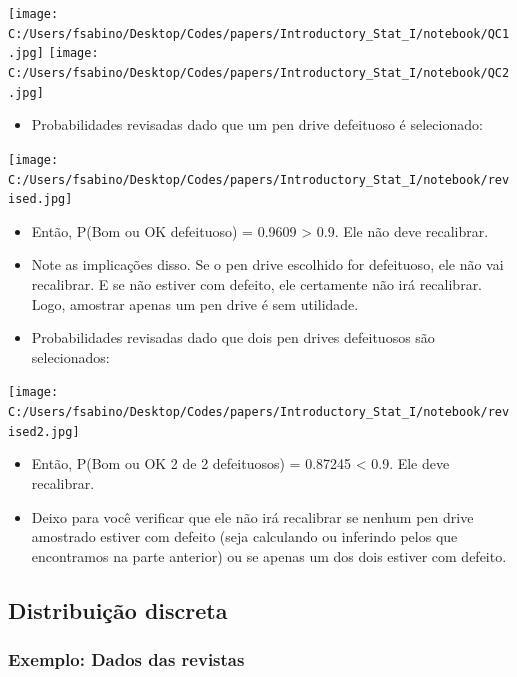 \documentclass[]{article}
\providecommand{\tightlist}{%
  \setlength{\itemsep}{0pt}\setlength{\parskip}{0pt}}
\begin{document}
\texttt{[image: C:/Users/fsabino/Desktop/Codes/papers/Introductory\_Stat\_I/notebook/QC1.jpg]}
\texttt{[image: C:/Users/fsabino/Desktop/Codes/papers/Introductory\_Stat\_I/notebook/QC2.jpg]}

\begin{itemize}
\tightlist
\item
  Probabilidades revisadas dado que um pen drive defeituoso é
  selecionado:
\end{itemize}

\texttt{[image: C:/Users/fsabino/Desktop/Codes/papers/Introductory\_Stat\_I/notebook/revised.jpg]}

\begin{itemize}
\item
  Então, P(Bom ou OK \textbar{} defeituoso) = 0.9609 \textgreater{} 0.9.
  Ele não deve recalibrar.
\item
  Note as implicações disso. Se o pen drive escolhido for defeituoso,
  ele não vai recalibrar. E se não estiver com defeito, ele certamente
  não irá recalibrar. Logo, amostrar apenas um pen drive é sem
  utilidade.
\item
  Probabilidades revisadas dado que dois pen drives defeituosos são
  selecionados:
\end{itemize}

\texttt{[image: C:/Users/fsabino/Desktop/Codes/papers/Introductory\_Stat\_I/notebook/revised2.jpg]}

\begin{itemize}
\item
  Então, P(Bom ou OK \textbar{} 2 de 2 defeituosos) = 0.87245
  \textless{} 0.9. Ele deve recalibrar.
\item
  Deixo para você verificar que ele não irá recalibrar se nenhum pen
  drive amostrado estiver com defeito (seja calculando ou inferindo
  pelos que encontramos na parte anterior) ou se apenas um dos dois
  estiver com defeito.
\end{itemize}

\subsection{Distribuição discreta}\label{distribuicao-discreta}

\subsubsection{Exemplo: Dados das
revistas}\label{exemplo-dados-das-revistas}
\end{document}
